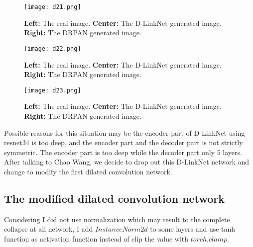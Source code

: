 \documentclass[a4paper]{article}
\begin{document}
\begin{figure}[hb]
\begin{center}
\texttt{[image: d21.png]}
\end{center}
\caption{{\bf Left:} The real image. {\bf Center:} The D-LinkNet generated image. {\bf Right:} The DRPAN generated image.}
\label{fig1}
\end{figure}

\begin{figure*}
\begin{center}
\texttt{[image: d22.png]}
\end{center}
\caption{{\bf Left:} The real image. {\bf Center:} The D-LinkNet generated image. {\bf Right:} The DRPAN generated image.}
\label{fig2}
\end{figure*}

\begin{figure*}
\begin{center}
\texttt{[image: d23.png]}
\end{center}
\caption{{\bf Left:} The real image. {\bf Center:} The D-LinkNet generated image. {\bf Right:} The DRPAN generated image.}
\label{fig3}
\end{figure*}

Possible reasons for this situation may be the encoder part of D-LinkNet using resnet34 is too deep, and the encoder part and the decoder part is not strictly symmetric. The encoder part is too deep while the decoder part only 5 layers. After talking to Chao Wang, we decide to drop out this D-LinkNet network and change to modify the first dilated convolution network.

\subsection{The modified dilated convolution network}

Considering I did not use normalization which may result to the complete collapse at all network, I add $InstanceNorm2d$ to some layers and use tanh function as activation function instead of clip the value with $torch.clamp$.
\end{document}
